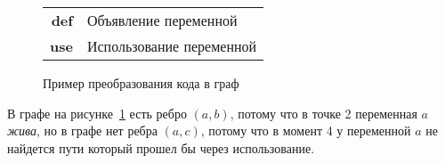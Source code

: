 \begin{example}
    \begin{figure}[h]
        \centering
    \caption{Пример преобразования кода в граф}
    \begin{tabular}{r @{: } l}
        \textbf{def} & Объявление переменной \\
        \textbf{use} & Использование переменной \\
    \end{tabular}
    \label{fig:ex1}
    \end{figure}

        


    В графе на рисунке~\ref{fig:ex1} есть ребро $(a, b)$, потому что в точке 2 переменная $a$ \textit{жива}, но в графе нет ребра $(a, c)$,
    потому что в момент 4 у переменной $a$ не найдется пути который прошел бы через использование.
    
\end{example}

